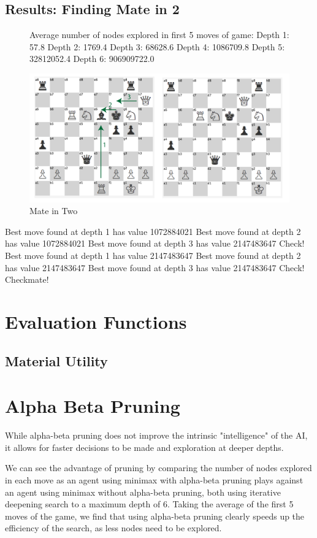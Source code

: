 \documentclass{article}
\begin{document}
\subsection{Results: Finding Mate in 2}

\begin{figure}[!htb]
\centering

Average number of nodes explored in first 5 moves of game:
Depth 1: 57.8
Depth 2: 1769.4
Depth 3: 68628.6
Depth 4: 1086709.8
Depth 5: 32812052.4
Depth 6: 906909722.0

\includegraphics[scale=0.65]{mateintwo.pdf}
\caption{Mate in Two}
\end{figure}

Best move found at depth 1 has value 1072884021
Best move found at depth 2 has value 1072884021
Best move found at depth 3 has value 2147483647
Check!
Best move found at depth 1 has value 2147483647
Best move found at depth 2 has value 2147483647
Best move found at depth 3 has value 2147483647
Check!
Checkmate!

\section{Evaluation Functions}

\subsection{Material Utility}

\section{Alpha Beta Pruning}
While alpha-beta pruning does not improve the intrinsic "intelligence" of the AI, it allows for faster decisions to be made and exploration at deeper depths.

We can see the advantage of pruning by comparing the number of nodes explored in each move as an agent using minimax with alpha-beta pruning plays against an agent using minimax without alpha-beta pruning, both using iterative deepening search to a maximum depth of 6. Taking the average of the first 5 moves of the game, we find that using alpha-beta pruning clearly speeds up the efficiency of the search, as less nodes need to be explored.
\end{document}
